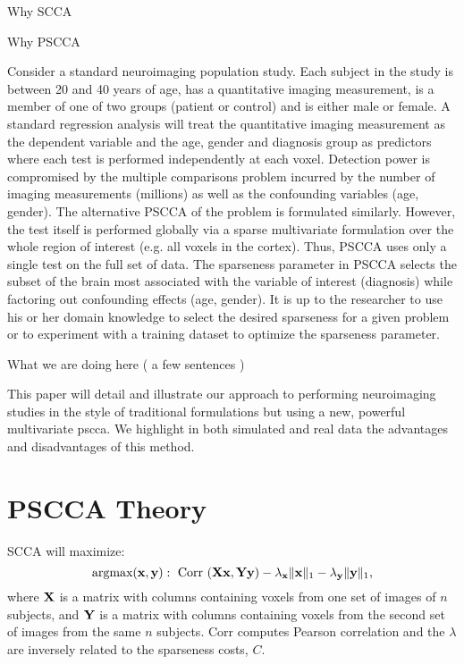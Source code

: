 \documentclass{llncs}
\newcommand{\X}{{\bf X}}
\newcommand{\x}{{\bf x}}
\newcommand{\Y}{{\bf Y}}
\newcommand{\y}{{\bf y}}
\begin{document}
Why SCCA

Why PSCCA

Consider a standard neuroimaging population study.  Each subject in
the study is between 20 and 40 years of age, has a quantitative
imaging measurement, is a member of one of two groups (patient or
control) and is either male or female.  A standard regression analysis
will treat the quantitative imaging measurement as the dependent
variable and the age, gender and diagnosis group as predictors where
each test is performed independently at each voxel.  Detection power
is compromised by the multiple comparisons problem incurred by the
number of imaging measurements (millions) as well as the confounding
variables (age, gender).  The alternative PSCCA of the problem is
formulated similarly.  However, the test itself is performed globally
via a sparse multivariate formulation over the whole region of
interest (e.g. all voxels in the cortex).  Thus, PSCCA uses only a
single test on the full set of data.  The sparseness parameter in
PSCCA selects the subset of the brain most associated with the
variable of interest (diagnosis) while factoring out confounding
effects (age, gender).  It is up to the researcher to use his or her
domain knowledge to select the desired sparseness for a given problem
or to experiment with a training dataset to optimize the sparseness
parameter.

What we are doing here ( a few sentences )

This paper will detail and illustrate our approach to performing
neuroimaging studies in the style of traditional formulations but
using a new, powerful multivariate pscca.  We highlight in both
simulated and real data the advantages and disadvantages of this
method.

\section{PSCCA Theory}
SCCA will maximize:
\begin{equation}
\text{argmax}( \x,\y) :
~\text{Corr}~( \X \x , \Y \y) - \lambda_\x \| \x \|_1 - \lambda_\y \|  \y  \|_1 , 
\end{equation} 
where $\X$ is a matrix with columns containing voxels from one set of
images of $n$ subjects, 
and $\Y$ is a matrix with columns containing voxels from the second
set of images from the same $n$ subjects. 
Corr computes Pearson correlation and the
$\lambda$ are inversely related to the sparseness costs, $C$.  %
\end{document}
